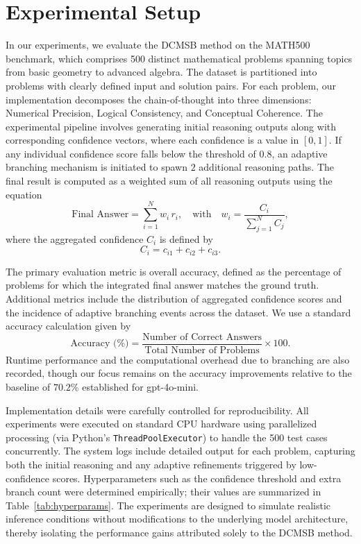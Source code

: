 \documentclass{article}
\begin{document}
\section{Experimental Setup}
In our experiments, we evaluate the DCMSB method on the MATH500 benchmark, which comprises 500 distinct mathematical problems spanning topics from basic geometry to advanced algebra. The dataset is partitioned into problems with clearly defined input and solution pairs. For each problem, our implementation decomposes the chain-of-thought into three dimensions: Numerical Precision, Logical Consistency, and Conceptual Coherence. The experimental pipeline involves generating initial reasoning outputs along with corresponding confidence vectors, where each confidence is a value in \([0,1]\). If any individual confidence score falls below the threshold of \(0.8\), an adaptive branching mechanism is initiated to spawn \(2\) additional reasoning paths. The final result is computed as a weighted sum of all reasoning outputs using the equation
\[
\text{Final Answer} = \sum_{i=1}^{N} w_i \, r_i, \quad \text{with} \quad w_i = \frac{C_i}{\sum_{j=1}^{N} C_j},
\]
where the aggregated confidence \(C_i\) is defined by
\[
C_i = c_{i1} + c_{i2} + c_{i3}.
\]

The primary evaluation metric is overall accuracy, defined as the percentage of problems for which the integrated final answer matches the ground truth. Additional metrics include the distribution of aggregated confidence scores and the incidence of adaptive branching events across the dataset. We use a standard accuracy calculation given by
\[
\text{Accuracy (\%)} = \frac{\text{Number of Correct Answers}}{\text{Total Number of Problems}} \times 100.
\]
Runtime performance and the computational overhead due to branching are also recorded, though our focus remains on the accuracy improvements relative to the baseline of \(70.2\%\) established for gpt-4o-mini.

Implementation details were carefully controlled for reproducibility. All experiments were executed on standard CPU hardware using parallelized processing (via Python's \texttt{ThreadPoolExecutor}) to handle the 500 test cases concurrently. The system logs include detailed output for each problem, capturing both the initial reasoning and any adaptive refinements triggered by low-confidence scores. Hyperparameters such as the confidence threshold and extra branch count were determined empirically; their values are summarized in Table~\ref{tab:hyperparams}. The experiments are designed to simulate realistic inference conditions without modifications to the underlying model architecture, thereby isolating the performance gains attributed solely to the DCMSB method.
\end{document}
